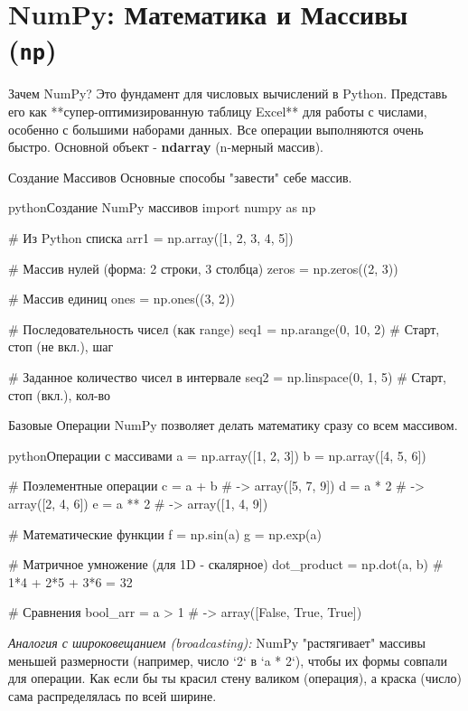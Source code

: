 
\section{NumPy: Математика и Массивы (\texttt{np})}

\begin{textbox}{Зачем NumPy?}
    Это фундамент для числовых вычислений в Python. Представь его как **супер-оптимизированную таблицу Excel** для работы с числами, особенно с большими наборами данных. Все операции выполняются очень быстро. Основной объект - \textbf{ndarray} (n-мерный массив).
\end{textbox}

\begin{myblock}{{Создание Массивов}}
    Основные способы "завести" себе массив.
    \begin{codebox}{python}{Создание NumPy массивов}
    import numpy as np

    # Из Python списка
    arr1 = np.array([1, 2, 3, 4, 5])

    # Массив нулей (форма: 2 строки, 3 столбца)
    zeros = np.zeros((2, 3))

    # Массив единиц
    ones = np.ones((3, 2))

    # Последовательность чисел (как range)
    seq1 = np.arange(0, 10, 2) # Старт, стоп (не вкл.), шаг

    # Заданное количество чисел в интервале
    seq2 = np.linspace(0, 1, 5) # Старт, стоп (вкл.), кол-во
    \end{codebox}
\end{myblock}

\begin{myblock}{{Базовые Операции}}
    NumPy позволяет делать математику сразу со всем массивом.
    \begin{codebox}{python}{Операции с массивами}
    a = np.array([1, 2, 3])
    b = np.array([4, 5, 6])

    # Поэлементные операции
    c = a + b  # -> array([5, 7, 9])
    d = a * 2  # -> array([2, 4, 6])
    e = a ** 2 # -> array([1, 4, 9])

    # Математические функции
    f = np.sin(a)
    g = np.exp(a)

    # Матричное умножение (для 1D - скалярное)
    dot_product = np.dot(a, b) # 1*4 + 2*5 + 3*6 = 32

    # Сравнения
    bool_arr = a > 1 # -> array([False, True, True])
    \end{codebox}
    \textit{Аналогия с широковещанием (broadcasting):} NumPy "растягивает" массивы меньшей размерности (например, число `2` в `a * 2`), чтобы их формы совпали для операции. Как если бы ты красил стену валиком (операция), а краска (число) сама распределялась по всей ширине.
\end{myblock}

